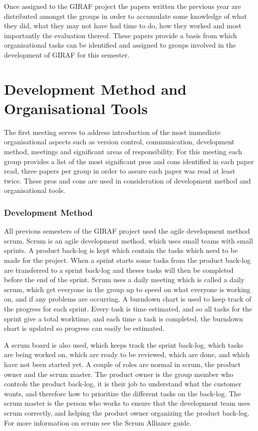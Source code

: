 Once assigned to the GIRAF project the papers written the previous year are distributed amongst the groups in order to accumulate some knowledge of what they did, what they may not have had time to do,  how they worked and most importantly the evaluation thereof.
These papers provide a basis from which organisational tasks can be identified and assigned to groups involved in the development of GIRAF for this semester.

\section{Development Method and Organisational Tools}
The first meeting serves to address introduction of the most immediate organisational aspects such as version control, communication, development method, meetings and significant areas of responsibility.
For this meeting each group provides a list of the most significant pros and cons identified in each paper read, three papers per group in order to assure each paper was read at least twice.
These pros and cons are used in consideration of development method and organisational tools.

\subsubsection*{Development Method}
All previous semesters of the GIRAF project used the agile development method scrum.
Scrum is an agile development method, which uses small teams with small sprints. 
A product back-log is kept which contain the tasks which need to be made for the project. 
When a sprint starts some tasks from the product back-log are transferred to a sprint back-log and theses tasks will then be completed before the end of the sprint.
Scrum uses a daily meeting which is called a daily scrum, which get everyone in the group up to speed on what everyone is working on, and if any problems are occurring. 
A burndown chart is used to keep track of the progress for each sprint. 
Every task is time estimated, and so all tasks for the sprint give a total worktime, and each time a task is completed, the burndown chart is updated so progress can easily be estimated.

A scrum board is also used, which keeps track the sprint back-log, which tasks are being worked on, which are ready to be reviewed, which are done, and which have not been started yet.
A couple of roles are normal in scrum, the product owner and the scrum master.
The product owner is the group member who controls the product back-log, it is their job to understand what the customer wants, and therefore how to prioritize the different tasks on the back-log.
The scrum master is the person who works to ensure that the development team uses scrum correctly, and helping the product owner organizing the product back-log.
For more information on scrum see the Scrum Alliance guide. \cite{scrum}

